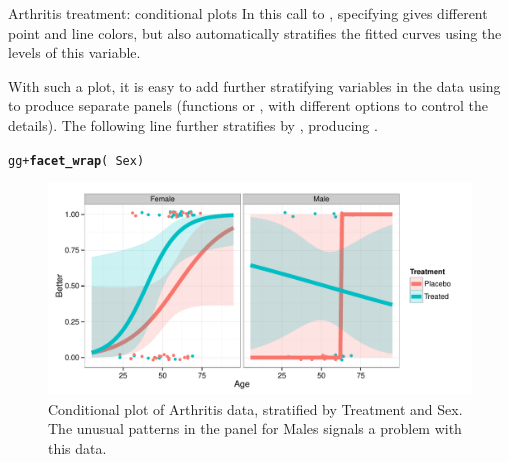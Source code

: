 \documentclass[11pt]{book}\usepackage[]{graphicx}\usepackage[]{color}
\makeatletter
\newcommand{\hlopt}[1]{\textcolor[rgb]{0,0,0}{#1}}%
\newcommand{\hlstd}[1]{\textcolor[rgb]{0.345,0.345,0.345}{#1}}%
\newcommand{\hlkwd}[1]{\textcolor[rgb]{0.737,0.353,0.396}{\textbf{#1}}}%
\newenvironment{kframe}{%
 \def\at@end@of@kframe{}%
 \ifinner\ifhmode%
  \def\at@end@of@kframe{\end{minipage}}%
  \begin{minipage}{\columnwidth}%
 \fi\fi%
 \def\FrameCommand##1{\hskip\@totalleftmargin \hskip-\fboxsep
 \colorbox{shadecolor}{##1}\hskip-\fboxsep
     \hskip-\linewidth \hskip-\@totalleftmargin \hskip\columnwidth}%
 \MakeFramed {\advance\hsize-\width
   \@totalleftmargin\z@ \linewidth\hsize
   \@setminipage}}%
 {\par\unskip\endMakeFramed%
 \at@end@of@kframe}
\newenvironment{knitrout}{}{} %
\renewenvironment{knitrout}{\small\renewcommand{\baselinestretch}{.85}}{} %
\makeatother
\begin{document}
\begin{Example}{Arthritis treatment: conditional plots}
\begin{knitrout}
\end{knitrout}
\noindent In this call to ,
specifying  gives different point and line colors, but also
automatically stratifies the fitted curves using the levels of this variable.

With such a plot, it is easy to add further stratifying variables in the data
using  to produce separate panels (functions  or , with
different options to control the details).  The following line further stratifies
by , producing .

\begin{knitrout}
\color{fgcolor}\begin{kframe}
\begin{alltt}
\hlstd{gg} \hlopt{+} \hlkwd{facet_wrap}\hlstd{(}\hlopt{~} \hlstd{Sex)}
\end{alltt}
\end{kframe}\begin{figure}[!htbp]


\centerline{\includegraphics[width=.8\textwidth,clip]{ch07/fig/arth-cond2-1} }

\caption[Conditional plot of Arthritis data, stratified by Treatment and Sex]{Conditional plot of Arthritis data, stratified by Treatment and Sex. The unusual patterns in the panel for Males signals a problem with this data.\label{fig:arth-cond2}}
\end{figure}



\end{knitrout}
\end{Example}
\end{document}
